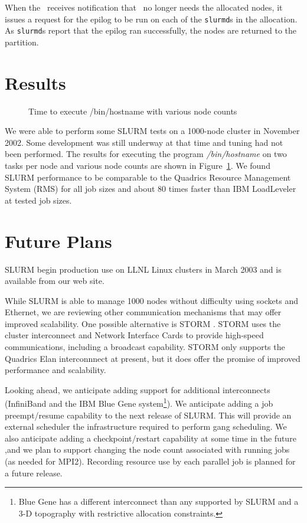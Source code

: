\documentclass[10pt,onecolumn,times]{../common/llncs}
\begin{document}
{When the \slurmctld\ receives notification that \srun\ no longer needs
the allocated nodes, it issues a request for the epilog to be run on
each of the {\tt slurmd}s in the allocation. As {\tt slurmd}s report that the
epilog ran successfully, the nodes are returned to the partition.

\section{Results}

\begin{figure}[htb]
\centerline{}
\caption{\small Time to execute /bin/hostname with various node counts}
\label{timing}
\end{figure}

We were able to perform some SLURM tests on a 1000-node cluster 
in November 2002. Some development was still underway at that time 
and tuning had not been performed. The results for executing the 
program {\em /bin/hostname} on two tasks per node and various node 
counts are shown in Figure~\ref{timing}. We found SLURM performance 
to be comparable to the
Quadrics Resource Management System (RMS) \cite{Quadrics2002} for all
job sizes and about 80 times faster than IBM LoadLeveler\cite{LL2002}
at tested job sizes.

\section{Future Plans}

SLURM begin production use on LLNL Linux clusters in March 2003 
and is available from our web site\cite{SLURM2003}. 

While SLURM is able to manage 1000 nodes without difficulty using
sockets and Ethernet, we are reviewing other communication mechanisms
that may offer improved scalability.  One possible alternative
is STORM \cite{STORM2001}.  STORM uses the cluster interconnect
and Network Interface Cards to provide high-speed communications,
including a broadcast capability.  STORM only supports the Quadrics
Elan interconnnect at present, but it does offer the promise of improved
performance and scalability.

Looking ahead, we anticipate adding support for additional 
interconnects (InfiniBand and the IBM
Blue Gene \cite{BlueGene2002} system\footnote{Blue Gene has a different
interconnect than any supported by SLURM and a 3-D topography with
restrictive allocation constraints.}).  We anticipate adding a job
preempt/resume capability to the next release of SLURM.  This will
provide an external scheduler the infrastructure required to perform gang
scheduling.  We also anticipate adding a checkpoint/restart capability at
some time in the future ,and we plan to support changing the node count
associated with running jobs (as needed for MPI2).  Recording resource
use by each parallel job is planned for a future release.

}
\end{document}
